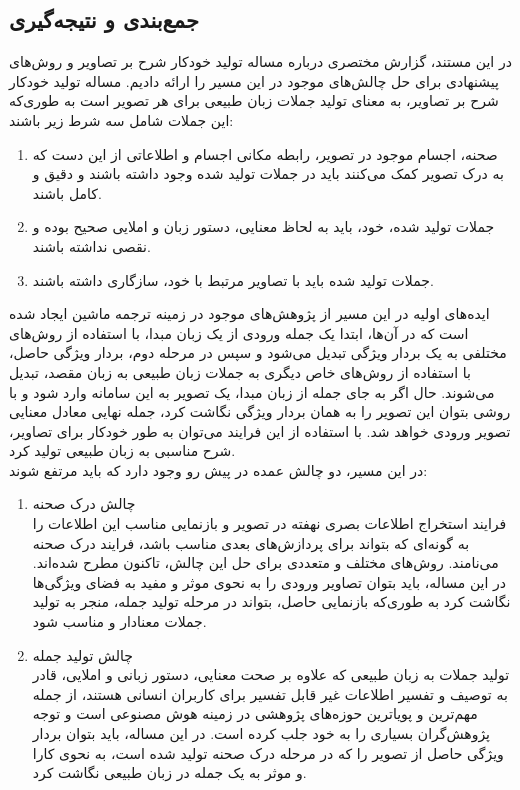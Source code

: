 \subsection{جمع‌بندی و نتیجه‌گیری}


در این مستند، گزارش مختصری درباره مساله تولید خودکار شرح بر تصاویر و روش‌های پیشنهادی برای حل چالش‌های موجود در این مسیر را ارائه دادیم. مساله تولید خودکار شرح بر تصاویر، به معنای تولید جملات زبان طبیعی برای هر تصویر است به طوری‌که این جملات شامل سه شرط زیر باشند:
\begin{enumerate}
\item صحنه، اجسام موجود در تصویر، رابطه مکانی اجسام و اطلاعاتی از این دست که به درک تصویر کمک می‌کنند باید در جملات تولید شده وجود داشته باشند و دقیق و کامل باشند.
\item جملات تولید شده، خود، باید به لحاظ معنایی، دستور زبان و املایی صحیح بوده و نقصی نداشته باشند.\
\item جملات تولید شده باید با تصاویر مرتبط با خود، سازگاری داشته باشند.
\end{enumerate}

ایده‌های اولیه در این مسیر از پژوهش‌های موجود در زمینه ترجمه ماشین ایجاد شده است که در آن‌ها، ابتدا یک جمله ورودی از یک زبان مبدا، با استفاده از روش‌های مختلفی به یک بردار ویژگی تبدیل می‌شود و سپس در مرحله دوم، بردار ویژگی حاصل، با استفاده از روش‌های خاص دیگری به جملات زبان طبیعی به زبان مقصد، تبدیل می‌شوند. حال اگر به جای جمله از زبان مبدا، یک تصویر به این سامانه وارد شود و با روشی بتوان این تصویر را به همان بردار ویژگی نگاشت کرد، جمله نهایی معادل معنایی تصویر ورودی خواهد شد. با استفاده از این فرایند می‌توان به طور خودکار برای تصاویر، شرح مناسبی به زبان طبیعی تولید کرد.
\\
در این مسیر، دو چالش عمده در پیش رو وجود دارد که باید مرتفع شوند:

\begin{enumerate}
\item چالش درک صحنه
\\
فرایند استخراج اطلاعات بصری نهفته در تصویر و بازنمایی مناسب این اطلاعات را به گونه‌ای که بتواند برای پردازش‌های بعدی مناسب باشد، فرایند درک صحنه می‌نامند. روش‌های مختلف و متعددی برای حل این چالش، تاکنون مطرح شده‌اند. در این مساله‌، باید بتوان تصاویر ورودی را به نحوی موثر و مفید به فضای ویژگی‌ها نگاشت کرد به طوری‌که بازنمایی حاصل، بتواند در مرحله تولید جمله، منجر به تولید جملات معنادار و مناسب شود.
\item چالش تولید جمله
\\
تولید جملات به زبان طبیعی که علاوه بر صحت معنایی، دستور زبانی و املایی، قادر به توصیف و تفسیر اطلاعات غیر قابل تفسیر برای کاربران انسانی هستند، از جمله مهم‌ترین و پویاترین حوزه‌های پژوهشی در زمینه هوش مصنوعی است و توجه پژوهش‌گران بسیاری را به‌ خود جلب کرده است. در این مساله، باید بتوان بردار ویژگی حاصل از تصویر را که در مرحله درک صحنه تولید شده است، به نحوی کارا و موثر به یک جمله در زبان طبیعی نگاشت کرد.
\end{enumerate}




